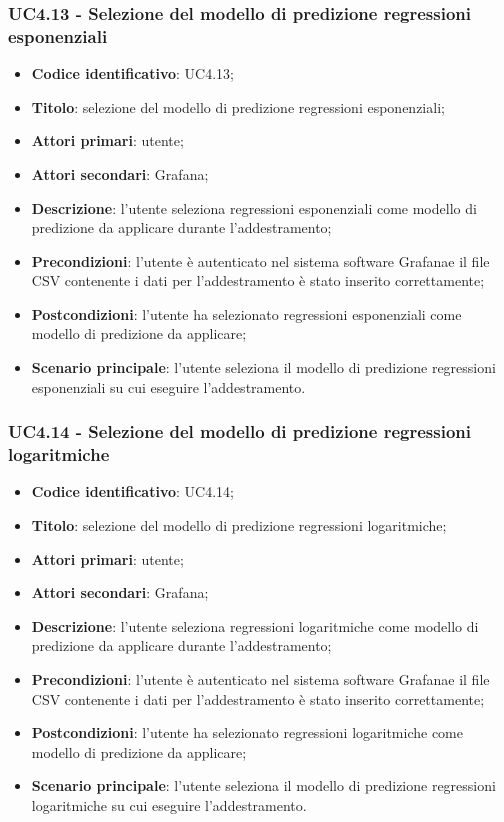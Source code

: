 \subsubsection{UC4.13 - Selezione del modello di predizione regressioni esponenziali}
\begin{itemize}
	\item \textbf{Codice identificativo}: UC4.13;
	\item \textbf{Titolo}: selezione del modello di predizione regressioni esponenziali;
	\item \textbf{Attori primari}: utente;
	\item \textbf{Attori secondari}: Grafana\glo;
	\item \textbf{Descrizione}: l'utente seleziona regressioni esponenziali come modello di predizione da applicare durante l'addestramento;
	\item \textbf{Precondizioni}: l'utente è autenticato nel sistema software Grafana\glosp e il file CSV contenente i dati per l'addestramento è stato inserito correttamente;
	\item \textbf{Postcondizioni}: l'utente ha selezionato regressioni esponenziali come modello di predizione da applicare;
	\item \textbf{Scenario principale}: l'utente seleziona il modello di predizione regressioni esponenziali su cui eseguire l'addestramento.
\end{itemize}
\subsubsection{UC4.14 - Selezione del modello di predizione regressioni logaritmiche}
\begin{itemize}
	\item \textbf{Codice identificativo}: UC4.14;
	\item \textbf{Titolo}: selezione del modello di predizione regressioni logaritmiche;
	\item \textbf{Attori primari}: utente;
	\item \textbf{Attori secondari}: Grafana\glo;
	\item \textbf{Descrizione}: l'utente seleziona regressioni logaritmiche come modello di predizione da applicare durante l'addestramento;
	\item \textbf{Precondizioni}: l'utente è autenticato nel sistema software Grafana\glosp e il file CSV contenente i dati per l'addestramento è stato inserito correttamente;
	\item \textbf{Postcondizioni}: l'utente ha selezionato regressioni logaritmiche come modello di predizione da applicare;
	\item \textbf{Scenario principale}: l'utente seleziona il modello di predizione regressioni logaritmiche su cui eseguire l'addestramento.
\end{itemize}
